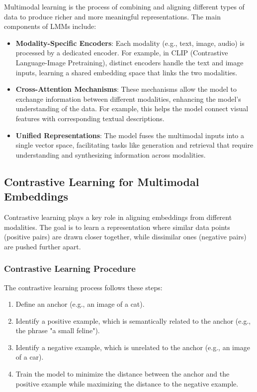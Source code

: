 Multimodal learning is the process of combining and aligning different types of data to produce richer and more meaningful representations. The main components of LMMs include:

\begin{itemize}
    \item \textbf{Modality-Specific Encoders}: Each modality (e.g., text, image, audio) is processed by a dedicated encoder. For example, in CLIP (Contrastive Language-Image Pretraining), distinct encoders handle the text and image inputs, learning a shared embedding space that links the two modalities.
  
    \item \textbf{Cross-Attention Mechanisms}: These mechanisms allow the model to exchange information between different modalities, enhancing the model's understanding of the data. For example, this helps the model connect visual features with corresponding textual descriptions.
  
    \item \textbf{Unified Representations}: The model fuses the multimodal inputs into a single vector space, facilitating tasks like generation and retrieval that require understanding and synthesizing information across modalities.
\end{itemize}

\subsection{Contrastive Learning for Multimodal Embeddings}
Contrastive learning plays a key role in aligning embeddings from different modalities. The goal is to learn a representation where similar data points (positive pairs) are drawn closer together, while dissimilar ones (negative pairs) are pushed further apart.
\subsubsection{Contrastive Learning Procedure}
The contrastive learning process follows these steps:
\begin{enumerate}
    \item Define an anchor (e.g., an image of a cat).
    \item Identify a positive example, which is semantically related to the anchor (e.g., the phrase "a small feline").
    \item Identify a negative example, which is unrelated to the anchor (e.g., an image of a car).
    \item Train the model to minimize the distance between the anchor and the positive example while maximizing the distance to the negative example.
\end{enumerate}

